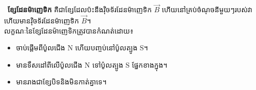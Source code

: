 \noindent
\begin{minipage}[t]{0.55\textwidth}
	\raggedright
	\faCaretRight~\textbf{\textcolor{brownheader}{ខ្សែដែនម៉ាញេទិក}} គឺជាខ្សែដែលប៉ះនឹងវ៉ិចទ័រដែនម៉ាញេទិក $\vec{B}$ ហើយនៅគ្រប់ចំណុចនីមួយៗរបស់វាហើយមានវ៉ិចទ័រដែនម៉ាញេទិក $\vec{B}$។\\
	លក្ខណៈនៃខ្សែដែនម៉ាញេទិកត្រូវបានកំណត់ដោយ៖
	\begin{itemize}[label={\textcolor{brownheader}{\faCaretRight}}]
	\item ចាប់ផ្តើមពីប៉ូលជើង {\englishfont N}
	ហើយបញ្ចប់នៅប៉ូលត្បូង {\englishfont S}។
	\item មានទឹសដៅពីលើប៉ូលជើង {\englishfont N}
	ទៅប៉ូលត្បូង {\englishfont S} ផ្នែកខាងក្នុង។
	\item មានរាងជាខ្សែបិទនិងមិនកាត់គ្នាទេ។
	\end{itemize}
\end{minipage}%
\hfill
